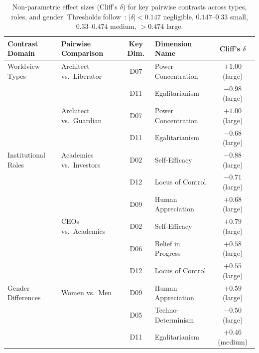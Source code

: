 \documentclass[12pt,a4paper]{article}
\begin{document}
\begin{table}[htbp]
  \centering
  \caption{Non-parametric effect sizes (Cliff's $\delta$) for key pairwise contrasts across types, roles, and gender. Thresholds follow~\citet{Romano2006}: $|\delta| < 0.147$ negligible, $0.147$--$0.33$ small, $0.33$--$0.474$ medium, $> 0.474$ large.}
  \label{tab:effect_sizes}
  \small
  \begin{tabularx}{\textwidth}{l l c Y c}
    \toprule
    \textbf{Contrast Domain} & \textbf{Pairwise Comparison} & \textbf{Key Dim.} & \textbf{Dimension Name} & \textbf{Cliff's $\delta$} \\
    \midrule
    Worldview Types & Architect vs.\ Liberator & D07 & Power Concentration & $+1.00$ (large) \\
                    &                          & D11 & Egalitarianism      & $-0.98$ (large) \\
                    \addlinespace[2pt]
                    & Architect vs.\ Guardian  & D07 & Power Concentration & $+1.00$ (large) \\
                    &                          & D11 & Egalitarianism      & $-0.68$ (large) \\
    \midrule
    Institutional Roles & Academics vs.\ Investors & D02 & Self-Efficacy       & $-0.88$ (large) \\
                        &                          & D12 & Locus of Control    & $-0.71$ (large) \\
                        &                          & D09 & Human Appreciation  & $+0.68$ (large) \\
                        \addlinespace[2pt]
                        & CEOs vs.\ Academics      & D02 & Self-Efficacy       & $+0.79$ (large) \\
                        &                          & D06 & Belief in Progress  & $+0.58$ (large) \\
                        &                          & D12 & Locus of Control    & $+0.55$ (large) \\
    \midrule
    Gender Differences  & Women vs.\ Men           & D09 & Human Appreciation  & $+0.59$ (large) \\
                        &                          & D05 & Techno-Determinism  & $-0.50$ (large) \\
                        &                          & D11 & Egalitarianism      & $+0.46$ (medium) \\
    \bottomrule
  \end{tabularx}
\end{table}
\end{document}
